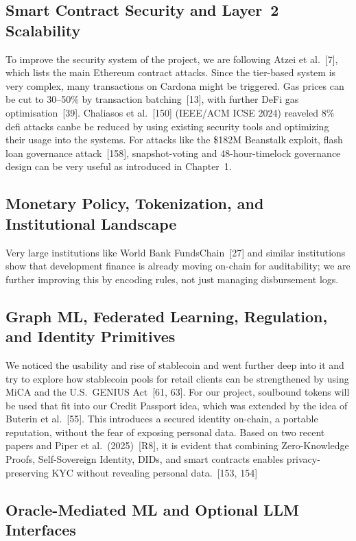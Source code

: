 \documentclass[12pt, a4paper]{report}
\begin{document}
\subsection{Smart Contract Security and Layer~2 Scalability}

To improve the security system of the project, we are following Atzei et al.~[7], which lists the main Ethereum contract attacks. Since the tier-based system is very complex, many transactions on Cardona might be triggered. Gas prices can be cut to 30--50\% by transaction batching~[13], with further DeFi gas optimisation~[39]. Chaliasos et al.~[150] (IEEE/ACM ICSE 2024) reaveled 8\% defi attacks canbe be reduced by using existing security tools and optimizing their usage into the systems. For attacks like the \$182M Beanstalk exploit, flash loan governance attack~[158], snapshot-voting and 48-hour-timelock governance design can be very useful as introduced in Chapter~1.

\subsection{Monetary Policy, Tokenization, and Institutional Landscape}
\label{sec:lit-institutional}

Very large institutions like World Bank FundsChain~[27] and similar institutions show that development finance is already moving on-chain for auditability; we are further improving this by encoding rules, not just managing disbursement logs.

\subsection{Graph ML, Federated Learning, Regulation, and Identity Primitives}

We noticed the usability and rise of stablecoin and went further deep into it and try to explore how stablecoin pools for retail clients can be strengthened by using MiCA and the U.S.\ GENIUS Act~[61, 63]. For our project, soulbound tokens will be used that fit into our Credit Passport idea, which was extended by the idea of Buterin et al.~[55]. This introduces a secured identity on-chain, a portable reputation, without the fear of exposing personal data. Based on two recent papers and Piper et al.~(2025)~[R8], it is evident that combining Zero-Knowledge Proofs, Self-Sovereign Identity, DIDs, and smart contracts enables privacy-preserving KYC without revealing personal data.~[153, 154]

\subsection{Oracle-Mediated ML and Optional LLM Interfaces}
\label{sec:lit-llm}
\end{document}
